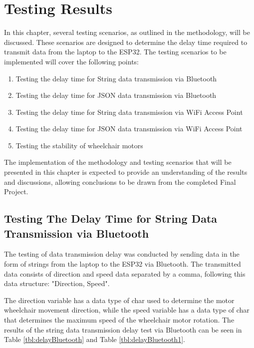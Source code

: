 \section{Testing Results}
\label{sec:hasil pengujian}

In this chapter, several testing scenarios, as outlined in the methodology, will be discussed. These scenarios are designed to determine the delay time required to transmit data from the laptop to the ESP32. The testing scenarios to be implemented will cover the following points:

\begin{enumerate}
  \item Testing the delay time for String data transmission via Bluetooth
  \item Testing the delay time for JSON data transmission via Bluetooth
  \item Testing the delay time for String data transmission via WiFi Access Point
  \item Testing the delay time for JSON data transmission via WiFi Access Point
  \item Testing the stability of wheelchair motors
\end{enumerate}

The implementation of the methodology and testing scenarios that will be presented in this chapter is expected to provide an understanding of the results and discussions, allowing conclusions to be drawn from the completed Final Project.

\subsection{Testing The Delay Time for String Data Transmission via Bluetooth}

The testing of data transmission delay was conducted by sending data in the form of strings from the laptop to the ESP32 via Bluetooth. The transmitted data consists of direction and speed data separated by a comma, following this data structure: "Direction, Speed".

The direction variable has a data type of char used to determine the motor wheelchair movement direction, while the speed variable has a data type of char that determines the maximum speed of the wheelchair motor rotation. The results of the string data transmission delay test via Bluetooth can be seen in Table \ref{tbl:delayBluetooth} and Table \ref{tbl:delayBluetooth1}.

